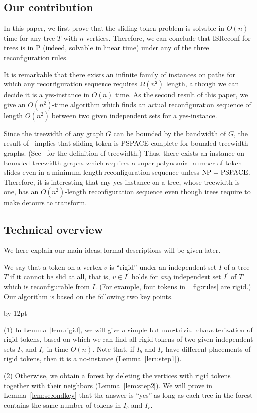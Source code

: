 \documentclass{llncs}
\newcommand{\bfI}{I}
\newenvironment{listing}[1]{\begin{list}{*}{\settowidth{\labelwidth}{#1}\setlength{\leftmargin}{\labelwidth}\advance \leftmargin by 12pt
\setlength{\itemsep}{0pt}\setlength{\parsep}{0pt}\setlength{\topsep}{0pt}\setlength{\parskip}{0pt}}}{\end{list}}
\newcounter{one}
\newcounter{two}
\newcounter{three}
\newcounter{four}
\begin{document}
\subsection{Our contribution}

	In this paper, we first prove that the {\sc sliding token} problem is solvable in $O(n)$ time for any tree $T$ with $n$ vertices. 
	Therefore, we can conclude that {\sc ISReconf} for trees is in P (indeed, solvable in linear time) under any of the three reconfiguration rules.
	
	It is remarkable that there exists an infinite family of instances on paths for which any reconfiguration sequence requires $\Omega(n^2)$ length, although we can decide it is a yes-instance in $O(n)$ time. 
	As the second result of this paper, we give an $O(n^2)$-time algorithm which finds an actual reconfiguration sequence of length $O(n^2)$ between two given independent sets for a yes-instance.
	
	Since the treewidth of any graph $G$ can be bounded by the bandwidth of $G$, the result of~\cite{Wro14} implies that {\sc sliding token} is PSPACE-complete for bounded treewidth graphs. 
(See~\cite{Bod98} for the definition of treewidth.)
	Thus, there exists an instance on bounded treewidth graphs which requires a super-polynomial number of token-slides even in a minimum-length reconfiguration sequence unless ${\rm NP} = {\rm PSPACE}$.
	Therefore, it is interesting that any yes-instance on a tree, whose treewidth is one, has an $O(n^2)$-length reconfiguration sequence even though trees require to make detours to transform.


\subsection{Technical overview}
\label{subsec:highlight}

	We here explain our main ideas;
formal descriptions will be given later. 

	We say that a token on a vertex $v$ is ``rigid'' under an independent set $\bfI$ of a tree $T$ if it cannot be slid at all, that is, $v \in \bfI^\prime$ holds for {\em any} independent set $\bfI^\prime$ of $T$ which is reconfigurable from $\bfI$.
(For example, four tokens in \figurename~\ref{fig:rules} are rigid.)
	Our algorithm is based on the following two key points. 
	\begin{listing}{aaa}
	\item[(1)] In Lemma~\ref{lem:rigid}, we will give a simple but non-trivial characterization of rigid tokens, based on which we can find all rigid tokens of two given independent sets $\bfI_b$ and $\bfI_r$ in time $O(n)$. 
	Note that, if $\bfI_b$ and $\bfI_r$ have different placements of rigid tokens, then it is a no-instance (Lemma~\ref{lem:step1}).
	\item[(2)] Otherwise, we obtain a forest by deleting the vertices with rigid tokens together with their neighbors (Lemma~\ref{lem:step2}).
	We will prove in Lemma~\ref{lem:secondkey} that the answer is ``yes'' as long as each tree in the forest contains the same number of tokens in $\bfI_b$ and $\bfI_r$. 
	\end{listing}
\end{document}
